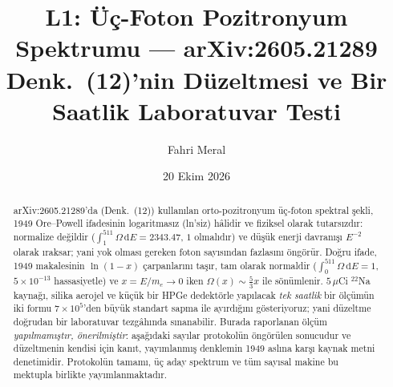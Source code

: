 \documentclass[11pt,a4paper]{article}
\title{\textbf{L1: Üç-Foton Pozitronyum Spektrumu --- arXiv:2605.21289 Denk.~(12)'nin Düzeltmesi ve Bir Saatlik Laboratuvar Testi}}
\author{Fahri Meral}
\date{20 Ekim 2026}
\begin{document}
\shorthandoff{=}

\maketitle

\begin{abstract}
arXiv:2605.21289'da (Denk.~(12)) kullanılan orto-pozitronyum üç-foton
spektral şekli, 1949 Ore--Powell ifadesinin logaritmasız (ln'siz) hâlidir
ve fiziksel olarak tutarsızdır: normalize değildir
($\int_1^{511}\Omega\,\mathrm{d}E = 2343.47$, $1$ olmalıdır) ve düşük
enerji davranışı $E^{-2}$ olarak ıraksar; yani yok olması gereken
foton sayısından fazlasını öngörür. Doğru ifade, 1949 makalesinin
$\ln(1-x)$ çarpanlarını taşır, tam olarak normaldir
($\int_0^{511}\Omega\,\mathrm{d}E = 1$, $5\times10^{-13}$ hassasiyetle)
ve $x = E/m_e \to 0$ iken $\Omega(x)\sim\tfrac{5}{3}x$ ile sönümlenir.
$5\,\mu$Ci $^{22}$Na kaynağı, silika aerojel ve küçük bir HPGe dedektörle
yapılacak \emph{tek saatlik} bir ölçümün iki formu $7\times10^{5}$'den
büyük standart sapma ile ayırdığını gösteriyoruz; yani düzeltme doğrudan
bir laboratuvar tezgâhında sınanabilir. Burada raporlanan ölçüm
\emph{yapılmamıştır, önerilmiştir}: aşağıdaki sayılar protokolün öngörülen
sonucudur ve düzeltmenin kendisi için kanıt, yayımlanmış denklemin 1949
aslına karşı kaynak metni denetimidir. Protokolün tamamı, üç aday
spektrum ve tüm sayısal makine bu mektupla birlikte yayımlanmaktadır.
\end{abstract}
\end{document}
